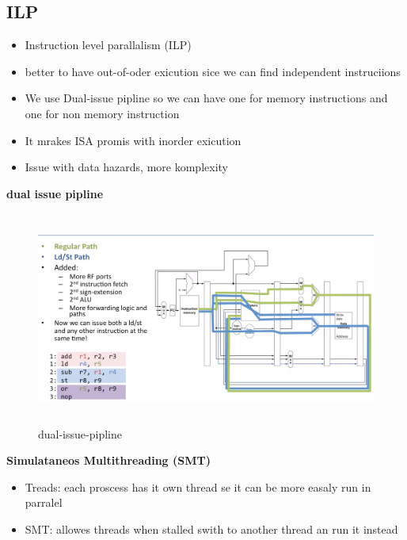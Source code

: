 \subsection{ILP}
\begin{itemize}
\item  Instruction level parallalism (ILP)
\item  better to have out-of-oder exicution sice we can find independent instruciions
\item  We use Dual-issue pipline so we can have one for memory instructions and
  one for non memory instruction
\item  It mrakes ISA promis with inorder exicution
\item  Issue with data hazards, more komplexity
\end{itemize}


\textbf{dual issue pipline}
\begin{figure}[h]
    \vspace{10mm}
    \centering
    \includegraphics[width=16cm, height=7cm]{image/dual-issue-pipline.png}
    \caption{dual-issue-pipline}
\end{figure}

\textbf{Simulataneos Multithreading (SMT)}
\begin{itemize}
\item  Treads: each proscess has it own thread se it can be more easaly run in parralel
\item  SMT: allowes threads when stalled swith to another thread an run it instead  
\end{itemize}

